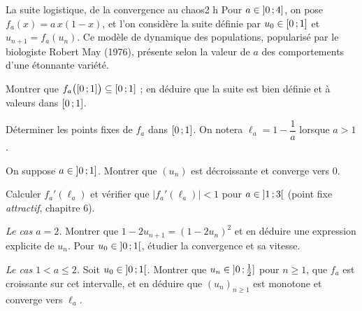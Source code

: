 

\begin{defi}{La suite logistique, de la convergence au chaos}{2 h}
Pour $a\in\mathopen{]}0\,{;}\,4\mathclose{]}$, on pose $f_a(x)=a\,x(1-x)$, et l'on considère la
suite définie par $u_0\in\mathopen{[}0\,{;}\,1\mathclose{]}$ et $u_{n+1}=f_a(u_n)$. Ce modèle de
dynamique des populations, popularisé par le biologiste Robert May (1976),
présente selon la valeur de $a$ des comportements d'une étonnante
variété.

\begin{questions}
  \item Montrer que $f_a\bigl(\mathopen{[}0\,{;}\,1\mathclose{]}\bigr)\subseteq\mathopen{[}0\,{;}\,1\mathclose{]}$ ;
    en déduire que la suite est bien définie et à valeurs dans
    $\mathopen{[}0\,{;}\,1\mathclose{]}$.
  \item Déterminer les points fixes de $f_a$ dans $\mathopen{[}0\,{;}\,1\mathclose{]}$. On notera
    $\ell_a=1-\dfrac1a$ lorsque $a>1$.
  \item On suppose $a\in\mathopen{]}0\,{;}\,1\mathclose{]}$. Montrer que $(u_n)$ est décroissante
    et converge vers $0$.
\end{questions}

\begin{questions}[resume]
  \item Calculer $f_a'(\ell_a)$ et vérifier que $\bigl|f_a'(\ell_a)\bigr|<1$
    pour $a\in\mathopen{]}1\,{;}\,3\mathclose{[}$ (point fixe \emph{attractif}, chapitre 6).
  \item \emph{Le cas $a=2$.} Montrer que $1-2u_{n+1}=(1-2u_n)^{2}$ et en
    déduire une expression explicite de $u_n$. Pour $u_0\in\mathopen{]}0\,{;}\,1\mathclose{[}$,
    étudier la convergence et sa vitesse.
  \item \emph{Le cas $1<a\leqslant2$.} Soit $u_0\in\mathopen{]}0\,{;}\,1\mathclose{[}$. Montrer
    que $u_n\in\mathopen{]}0\,{;}\,\frac12\mathclose{]}$ pour $n\geqslant1$, que $f_a$ est
    croissante sur cet intervalle, et en déduire que $(u_n)_{n\geqslant1}$
    est monotone et converge vers $\ell_a$.
\end{questions}


\end{defi}
